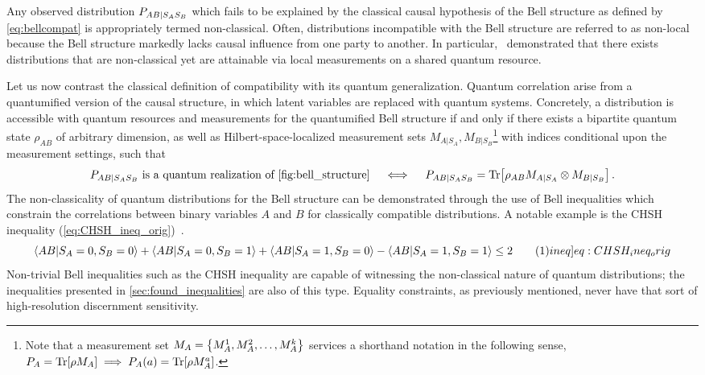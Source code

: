 \documentclass[aps, 10pt, english, twoside, pra, nofootinbib, tightenlines, longbibliography, superscriptaddress]{revtex4-1}
\begin{document}
    Any observed distribution $\prob[AB|S_AS_B]$ which fails to be explained by the classical causal hypothesis of the Bell structure as defined by \cref{eq:bellcompat} is appropriately termed non-classical. Often, distributions incompatible with the Bell structure are referred to as non-local because the Bell structure markedly lacks causal influence from one party to another. In particular,~\citet{Bell_1964} demonstrated that there exists distributions that are non-classical yet are attainable via local measurements on a shared quantum resource.

    Let us now contrast the classical definition of compatibility with its quantum generalization. Quantum correlation arise from a quantumified version of the causal structure, in which latent variables are replaced with quantum systems. Concretely, a distribution is accessible with quantum resources and measurements for the quantumified Bell structure if and only if there exists a bipartite quantum state $\rho_{AB}$ of arbitrary dimension, as well as Hilbert-space-localized measurement sets $M_{A|S_A}, M_{B|S_B}$\footnote{Note that a measurement set $M_{A} = \bc{M_{A}^{1}, M_{A}^{2}, \ldots, M_{A}^{k}}$ services a shorthand notation in the following sense, $\prob[A] = \Tr\bs{\rho M_{A}} \implies \prob[A]\br{a} = \Tr\bs{\rho M_{A}^{a}}$.} with indices conditional upon the measurement settings, such that
    \begin{align}\label{eq:bellQcompat}
    \prob[AB|S_AS_B] \text{ is a quantum realization of \cref{fig:bell_structure}} \quad\iff\quad\prob[AB|S_AS_B] = \Tr\bs{\rho_{AB}M_{A|S_A}\otimes M_{B|S_B}}\,.
    \end{align}
    The non-classicality of quantum distributions for the Bell structure can be demonstrated through the use of Bell inequalities which constrain the correlations between binary variables $A$ and $B$ for classically compatible distributions. A notable example is the CHSH inequality (\cref{eq:CHSH_ineq_orig})~\cite{CHSH_Original}.
    \[ \ba{AB | S_{A} = 0, S_{B} = 0} + \ba{AB | S_{A} = 0, S_{B} = 1} + \ba{AB | S_{A} = 1, S_{B} = 0} - \ba{AB | S_{A} = 1, S_{B} = 1} \leq 2 \eq \label[ineq]{eq:CHSH_ineq_orig} \]
    Non-trivial Bell inequalities such as the CHSH inequality are capable of witnessing the non-classical nature of quantum distributions; the inequalities presented in \cref{sec:found_inequalities} are also of this type. Equality constraints, as previously mentioned, never have that sort of high-resolution discernment sensitivity.
\end{document}
